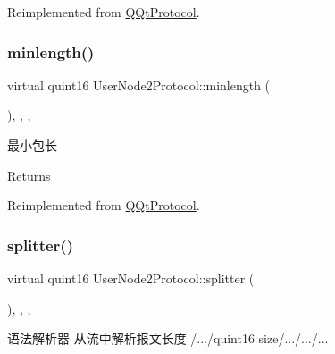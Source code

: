 Reimplemented from \mbox{\hyperlink{class_q_qt_protocol_af41bc3116abbbcfc9af45e151a253ff7}{Q\+Qt\+Protocol}}.

\mbox{\label{class_user_node2_protocol_a33e438499c773f7c51f62537a98bb48a}} 
\subsubsection{\texorpdfstring{minlength()}{minlength()}}
{\footnotesize\ttfamily virtual quint16 User\+Node2\+Protocol\+::minlength (\begin{DoxyParamCaption}{ }\end{DoxyParamCaption})\hspace{0.3cm}{\ttfamily [inline]}, {\ttfamily [override]}, {\ttfamily [protected]}, {\ttfamily [virtual]}}



最小包长 

\begin{DoxyReturn}{Returns}

\end{DoxyReturn}


Reimplemented from \mbox{\hyperlink{class_q_qt_protocol_a2b00f53d3dd0eed817eeecff422891f3}{Q\+Qt\+Protocol}}.

\mbox{\label{class_user_node2_protocol_acc3d5dace667ef971078b7f605b9be6a}} 
\subsubsection{\texorpdfstring{splitter()}{splitter()}}
{\footnotesize\ttfamily virtual quint16 User\+Node2\+Protocol\+::splitter (\begin{DoxyParamCaption}\item[{const Q\+Byte\+Array \&}]{ }\end{DoxyParamCaption})\hspace{0.3cm}{\ttfamily [inline]}, {\ttfamily [override]}, {\ttfamily [protected]}, {\ttfamily [virtual]}}



语法解析器 从流中解析报文长度 /.../quint16 size/.../.../... 


